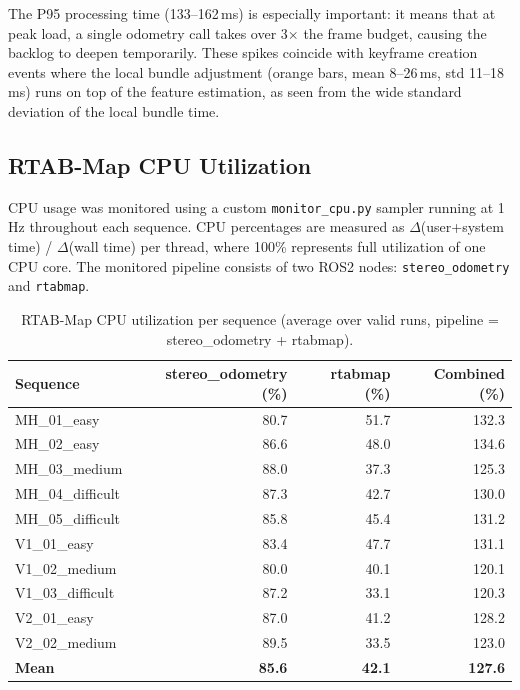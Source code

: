\documentclass[11pt]{article}
\begin{document}
The P95 processing time (133--162\,ms) is especially important: it means that at peak load, a single odometry call takes over 3$\times$ the frame budget, causing the backlog to deepen temporarily. These spikes coincide with keyframe creation events where the local bundle adjustment (orange bars, mean 8--26\,ms, std 11--18\,ms) runs on top of the feature estimation, as seen from the wide standard deviation of the local bundle time.

\subsection{RTAB-Map CPU Utilization}

CPU usage was monitored using a custom \texttt{monitor\_cpu.py} sampler running at 1\,Hz throughout each sequence. CPU percentages are measured as $\Delta$(user+system time) / $\Delta$(wall time) per thread, where 100\% represents full utilization of one CPU core. The monitored pipeline consists of two ROS2 nodes: \texttt{stereo\_odometry} and \texttt{rtabmap}.

\begin{table}[H]
\centering
\small
\caption{RTAB-Map CPU utilization per sequence (average over valid runs, pipeline = stereo\_odometry + rtabmap).}
\label{tab:rtabmap_cpu}
\begin{tabular}{lrrr}
\toprule
Sequence & stereo\_odometry (\%) & rtabmap (\%) & Combined (\%) \\
\midrule
MH\_01\_easy       & 80.7  & 51.7 & 132.3 \\
MH\_02\_easy       & 86.6  & 48.0 & 134.6 \\
MH\_03\_medium     & 88.0  & 37.3 & 125.3 \\
MH\_04\_difficult  & 87.3  & 42.7 & 130.0 \\
MH\_05\_difficult  & 85.8  & 45.4 & 131.2 \\
V1\_01\_easy       & 83.4  & 47.7 & 131.1 \\
V1\_02\_medium     & 80.0  & 40.1 & 120.1 \\
V1\_03\_difficult  & 87.2  & 33.1 & 120.3 \\
V2\_01\_easy       & 87.0  & 41.2 & 128.2 \\
V2\_02\_medium     & 89.5  & 33.5 & 123.0 \\
\midrule
\textbf{Mean}      & \textbf{85.6} & \textbf{42.1} & \textbf{127.6} \\
\bottomrule
\end{tabular}
\end{table}
\end{document}
